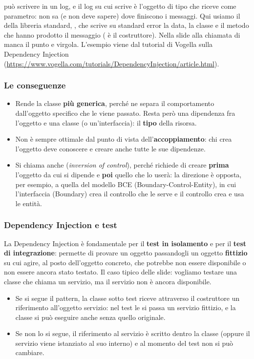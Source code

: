 \medskip
{} può scrivere in un log, e il log su cui scrive è l'oggetto di tipo  che riceve come parametro: non
sa (e non deve sapere) dove finiscono i messaggi. Qui usiamo il  della libreria standard,
, che scrive su standard error la data, la classe e il metodo che hanno prodotto il messaggio
( è il costruttore). Nella slide alla chiamata di  manca il punto e virgola. L'esempio viene
dal tutorial di Vogella sulla Dependency Injection (\url{https://www.vogella.com/tutorials/DependencyInjection/article.html}).

\subsubsection*{Le conseguenze}

\begin{itemize}
  \item Rende la classe \textbf{più generica}, perché ne separa il comportamento dall'oggetto specifico che le viene passato.
        Resta però una dipendenza fra l'oggetto e una classe (o un'interfaccia): il \textbf{tipo} della risorsa.
  \item Non è sempre ottimale dal punto di vista dell'\textbf{accoppiamento}: chi crea l'oggetto deve conoscere e creare anche
        tutte le sue dipendenze.
  \item Si chiama anche  (\textit{inversion of control}), perché richiede di creare
        \textbf{prima} l'oggetto da cui si dipende e \textbf{poi} quello che lo userà: la direzione è opposta, per esempio, a
        quella del modello BCE (Boundary-Control-Entity), in cui l'interfaccia (Boundary) crea il controllo che le serve e il
        controllo crea e usa le entità.
\end{itemize}

\subsubsection*{Dependency Injection e test}

La Dependency Injection è fondamentale per il \textbf{test in isolamento} e per il \textbf{test di integrazione}: permette di
provare un oggetto passandogli un oggetto \textbf{fittizio} su cui agire, al posto dell'oggetto concreto, che potrebbe non
essere disponibile o non essere ancora stato testato. Il caso tipico delle slide: vogliamo testare una classe che chiama un
servizio, ma il servizio non è ancora disponibile.
\begin{itemize}
  \item Se si segue il pattern, la classe sotto test riceve attraverso il costruttore un riferimento all'oggetto servizio:
        nel test le si passa un servizio fittizio, e la classe si può eseguire anche senza quello originale.
  \item Se non lo si segue, il riferimento al servizio è scritto dentro la classe (oppure il servizio viene istanziato al
        suo interno) e al momento del test non si può cambiare.
\end{itemize}

